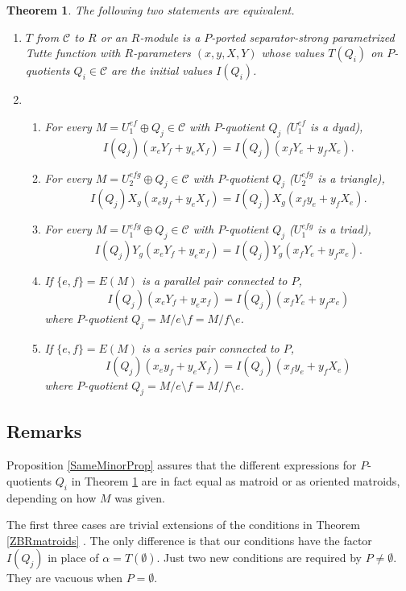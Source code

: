 \documentclass[12pt,leqno]{amsart}
\newtheorem{thm}[lem]{Theorem}
\theoremstyle{remark}
\begin{document}
\begin{thm}
\label{BigTheorem}
The following two statements are equivalent.
\begin{enumerate}
\item $T$ from $\mathcal{C}$ to $R$ or an $R$-module is a $P$-ported 
separator-strong parametrized
Tutte function with $R$-parameters $(x, y, X, Y)$ whose values 
$T(Q_i)$ on $P$-quotients $Q_i\in\mathcal{C}$ are the initial
values $I(Q_i)$.
\item
\begin{enumerate}
\item For every $M=U^{ef}_1\oplus Q_j\in\mathcal{C}$ with 
$P$-quotient $Q_j$ ($U^{ef}_1$ is a dyad), 
\[
I(Q_j)(x_e Y_f + y_e X_f) = 
I(Q_j)(x_f Y_e + y_f X_e).
\]
\item
For every $M=U^{efg}_2\oplus Q_j\in\mathcal{C}$ with 
$P$-quotient $Q_j$ ($U^{efg}_2$ is a triangle), 
\[
I(Q_j)X_g(x_e y_f + y_e X_f) = 
I(Q_j)X_g(x_f y_e + y_f X_e).
\]
\item
For every $M=U^{efg}_1\oplus Q_j\in\mathcal{C}$ with 
$P$-quotient $Q_j$  ($U^{efg}_1$ is a triad), 
\[
I(Q_j)Y_g(x_e Y_f + y_e x_f) = 
I(Q_j)Y_g(x_f Y_e + y_f x_e).
\]
\item
If $\{e,f\}=E(M)$ is a parallel pair connected to $P$, 
\[
I(Q_j)(x_e Y_f + y_e x_f) = 
I(Q_j)(x_f Y_e + y_f x_e)
\]
where $P$-quotient $Q_j=M/e\setminus f=M/f\setminus e$.
\item
If $\{e,f\}=E(M)$ is a series pair connected to $P$, 
\[
I(Q_j)(x_e y_f + y_e X_f) = 
I(Q_j)(x_f y_e + y_f X_e)
\]
where $P$-quotient $Q_j=M/e\setminus f=M/f\setminus e$.
\end{enumerate}
\end{enumerate}
\end{thm}

\subsection{Remarks}
Proposition \ref{SameMinorProp} assures that the different 
expressions for $P$-quotients $Q_i$ in Theorem \ref{BigTheorem} 
are in fact equal as matroid or as oriented matroids, depending
on how $M$ was given.  

The first three cases are trivial extensions of 
the conditions in Theorem \ref{ZBRmatroids} \cite{Ellis-Monaghan-Traldi}.  
The only difference
is that our conditions have the factor $I(Q_j)$ 
in place of $\alpha=T(\emptyset)$.
Just two new conditions are required by $P\neq\emptyset$.  They
are vacuous when $P=\emptyset$.
\end{document}
